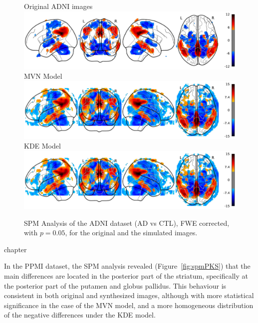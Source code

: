 \begin{figure}
	\centering
	Original ADNI images\\
	\includegraphics[width=0.8\linewidth]{Graphics/ch8/NORvsAD_Orig_glass}\\
	\ac{MVN} Model\\
	\includegraphics[width=0.8\linewidth]{Graphics/ch8/NORvsAD_MVN_glass}\\
	\ac{KDE} Model\\
	\includegraphics[width=0.8\linewidth]{Graphics/ch8/NORvsAD_KDE_glass}
	\caption[\acs{SPM} Analysis of the ADNI dataset.]{\ac{SPM} Analysis of the ADNI dataset (\ac{AD} vs \ac{CTL}), \ac{FWE} corrected, with $p=0.05$, for the original and the simulated images.}
	\label{fig:spmAD}
\end{figure}chapter

In the PPMI dataset, the \ac{SPM} analysis revealed (Figure~\ref{fig:spmPKS}) that the main differences are located in the posterior part of the striatum, specifically at the posterior part of the putamen and globus pallidus. This behaviour is consistent in both original and synthesized images, although with more statistical significance in the case of the \ac{MVN} model, and a more homogeneous distribution of the negative differences under the \ac{KDE} model. 


